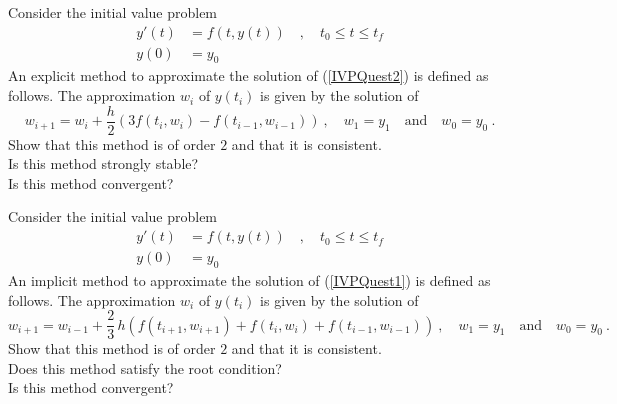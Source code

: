 \begin{question}
Consider the initial value problem
\begin{equation} \label{IVPQuest2}
\begin{split}
y'(t) &= f(t,y(t)) \quad , \quad t_0 \leq t \leq t_f \\
y(0) &= y_0
\end{split}
\end{equation}
An explicit method to approximate the solution of (\ref{IVPQuest2}) is
defined as follows.  The approximation $w_i$ of $y(t_i)$ is given by
the solution of
\[
w_{i+1} = w_i + \frac{h}{2}\left( 3 f(t_i,w_i) - f(t_{i-1},w_{i-1})
\right) \ , \quad
w_1 = y_1 \quad \text{and} \quad w_0 = y_0 \ .
\]
 Show that this method is of order $2$ and that it is
consistent.\\
 Is this method strongly stable?\\
 Is this method convergent?
\end{question}

\begin{question}
Consider the initial value problem
\begin{equation} \label{IVPQuest1}
\begin{split}
y'(t) &= f(t,y(t)) \quad , \quad t_0 \leq t \leq t_f \\
y(0) &= y_0
\end{split}
\end{equation}
An implicit method to approximate the solution of (\ref{IVPQuest1}) is
defined as follows.  The approximation $w_i$ of $y(t_i)$ is given by 
the solution of
\[
w_{i+1} = w_{i-1} + \frac{2}{3} \,h\left( f(t_{i+1},w_{i+1}) +
 f(t_{i},w_{i}) +  f(t_{i-1},w_{i-1}) \right) \ , \quad
w_1 = y_1 \quad \text{and} \quad  w_0 = y_0  \ .
\]
 Show that this method is of order $2$ and that it is
consistent. \\
 Does this method satisfy the root condition?\\
 Is this method convergent?
\end{question}

